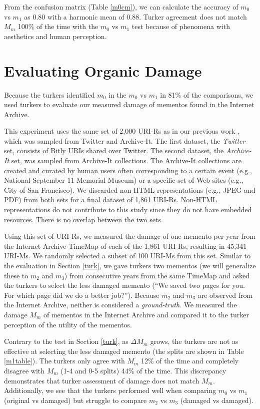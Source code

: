 From the confusion matrix (Table \ref{m0cm}), we can calculate the accuracy of $m_0$ vs $m_1$ as 0.80 with a harmonic mean of 0.88. Turker agreement does not match $M_m$ 100\% of the time with the $m_0$ vs $m_1$ test because of phenomena with aesthetics and human perception. 

\section{Evaluating Organic Damage}
\label{turkActual}
Because the turkers identified $m_0$ in the $m_0$ vs $m_1$ in 81\% of the comparisons, we used turkers to evaluate our measured damage of mementos found in the Internet Archive. 

This experiment uses the same set of 2,000 URI-Rs as in our previous work \cite{ijdl}, which was sampled from Twitter and Archive-It. The first dataset, the \emph{Twitter} set, consists of Bitly URIs shared over Twitter. The second dataset, the \emph{Archive-It} set, was sampled from Archive-It collections. The Archive-It collections are created and curated by human users often corresponding to a certain event (e.g., National September 11 Memorial Museum) or a specific set of Web sites (e.g., City of San Francisco). We discarded non-HTML representations (e.g., JPEG and PDF) from both sets for a final dataset of 1,861 URI-Rs. Non-HTML representations do not contribute to this study since they do not have embedded resources. There is no overlap between the two sets.

Using this set of URI-Rs, we measured the damage of one memento per year from the Internet Archive TimeMap of each of the 1,861 URI-Rs, resulting in 45,341 URI-Ms. We randomly selected a subset of 100 URI-Ms from this set. Similar to the evaluation in Section \ref{turk}, we gave turkers two mementos (we will generalize these to $m_2$ and $m_3$) from consecutive years from the same TimeMap and asked the turkers to select the less damaged memento (``We saved two pages for you. For which page did we do a better job?''). Because $m_2$ and $m_3$ are observed from the Internet Archive, neither is considered a \emph{ground-truth}. We measured the damage $M_m$ of mementos in the Internet Archive and compared it to the turker perception of the utility of the mementos. 

Contrary to the test in Section \ref{turk}, as {$\Delta M_m$} grows, the turkers are not as effective at selecting the less damaged memento (the splits are shown in Table \ref{m1table}). The turkers only agree with $M_m$ 12\% of the time and completely disagree with $M_m$ (1-4 and 0-5 splits) 44\% of the time. This discrepancy demonstrates that turker assessment of damage does not match $M_m$. Additionally, we see that the turkers performed well when comparing $m_0$ vs $m_1$ (original vs damaged) but struggle to compare $m_2$ vs $m_3$ (damaged vs damaged).


